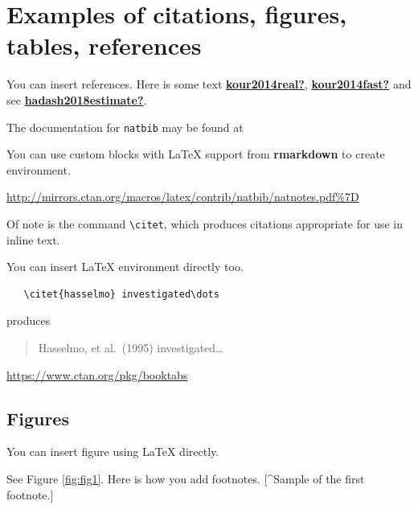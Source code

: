 \documentclass{article}
\begin{document}
\label{sec:headings}

\hypertarget{examples-of-citations-figures-tables-references}{%
\section{Examples of citations, figures, tables,
references}\label{examples-of-citations-figures-tables-references}}

\label{sec:others}

You can insert references. Here is some text
\protect\hyperlink{ref-kour2014real}{\textbf{kour2014real?}},
\protect\hyperlink{ref-kour2014fast}{\textbf{kour2014fast?}} and see
\protect\hyperlink{ref-hadash2018estimate}{\textbf{hadash2018estimate?}}.

The documentation for \verb+natbib+ may be found at

You can use custom blocks with LaTeX support from \textbf{rmarkdown} to
create environment.

\begin{center}
\url{http://mirrors.ctan.org/macros/latex/contrib/natbib/natnotes.pdf\%7D}

\end{center}

Of note is the command \verb+\citet+, which produces citations
appropriate for use in inline text.

You can insert LaTeX environment directly too.

\begin{verbatim}
   \citet{hasselmo} investigated\dots
\end{verbatim}

produces

\begin{quote}
  Hasselmo, et al.\ (1995) investigated\dots
\end{quote}

\begin{center}
  \url{https://www.ctan.org/pkg/booktabs}
\end{center}

\hypertarget{figures}{%
\subsection{Figures}\label{figures}}

You can insert figure using LaTeX directly.

See Figure \ref{fig:fig1}. Here is how you add footnotes. {[}\^{}Sample
of the first footnote.{]}
\end{document}
